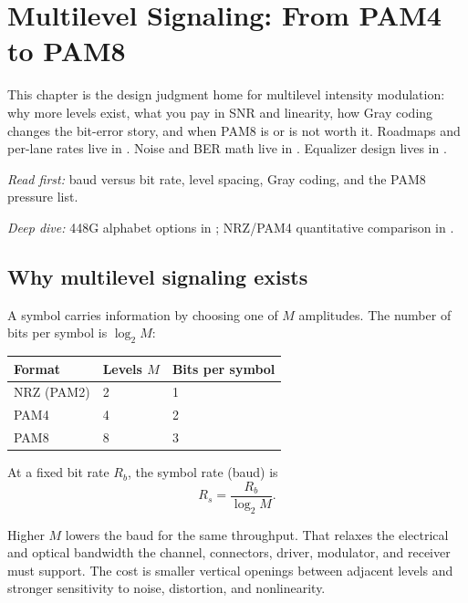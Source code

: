 \chapter{Multilevel Signaling: From PAM4 to PAM8}
\label{ch:multilevel}
\label{ch:pam}

This chapter is the design judgment home for multilevel intensity modulation:
why more levels exist, what you pay in SNR and linearity, how Gray coding
changes the bit-error story, and when PAM8 is or is not worth it. Roadmaps and
per-lane rates live in . Noise and BER math live in
. Equalizer design lives in .

\textit{Read first:} baud versus bit rate, level spacing, Gray coding, and the
PAM8 pressure list.

\textit{Deep dive:} 448G alphabet options in ;
NRZ/PAM4 quantitative comparison in .


\section{Why multilevel signaling exists}
\label{sec:multilevel-why}

A symbol carries information by choosing one of \(M\) amplitudes. The number of
bits per symbol is \(\log_2 M\):

\begin{center}
\footnotesize
\begin{tabular}{@{}lll@{}}
\toprule
Format & Levels \(M\) & Bits per symbol \\
\midrule
NRZ (PAM2) & 2 & 1 \\
PAM4 & 4 & 2 \\
PAM8 & 8 & 3 \\
\bottomrule
\end{tabular}
\end{center}

At a fixed bit rate \(R_b\), the symbol rate (baud) is
\begin{equation}
R_s = \frac{R_b}{\log_2 M}.
\label{eq:baud-vs-bitrate}
\end{equation}

Higher \(M\) lowers the baud for the same throughput. That relaxes the
electrical and optical bandwidth the channel, connectors, driver, modulator,
and receiver must support. The cost is smaller vertical openings between
adjacent levels and stronger sensitivity to noise, distortion, and nonlinearity.


